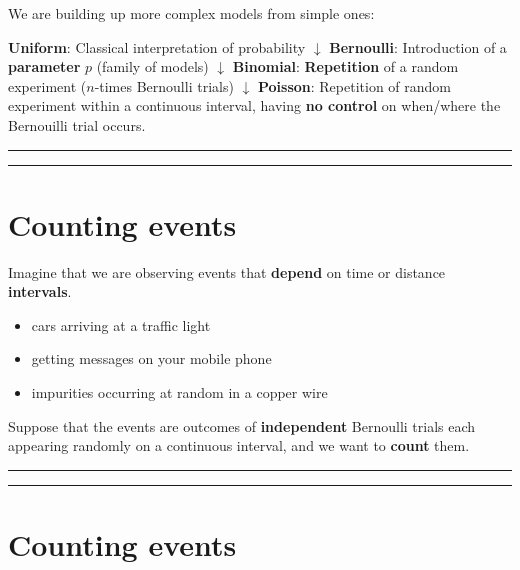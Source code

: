 \documentclass[
]{book}
\providecommand{\tightlist}{%
  \setlength{\itemsep}{0pt}\setlength{\parskip}{0pt}}
\begin{document}
We are building up more complex models from simple ones:

\textbf{Uniform}: Classical interpretation of probability
\(\downarrow\)
\textbf{Bernoulli}: Introduction of a \textbf{parameter} \(p\) (family of models)
\(\downarrow\)
\textbf{Binomial}: \textbf{Repetition} of a random experiment (\(n\)-times Bernoulli trials)
\(\downarrow\)
\textbf{Poisson}: Repetition of random experiment within a continuous interval, having \textbf{no control} on when/where the Bernouilli trial occurs.

\begin{center}\rule{0.5\linewidth}{0.5pt}\end{center}

\begin{center}\rule{0.5\linewidth}{0.5pt}\end{center}

\hypertarget{counting-events}{%
\section{Counting events}\label{counting-events}}

Imagine that we are observing events that \textbf{depend} on time or distance \textbf{intervals}.

\begin{itemize}
\tightlist
\item
  cars arriving at a traffic light
\item
  getting messages on your mobile phone
\item
  impurities occurring at random in a copper wire
\end{itemize}

Suppose that the events are outcomes of \textbf{independent} Bernoulli trials each appearing randomly on a continuous interval, and we want to \textbf{count} them.

\begin{center}\rule{0.5\linewidth}{0.5pt}\end{center}

\begin{center}\rule{0.5\linewidth}{0.5pt}\end{center}

\hypertarget{counting-events-1}{%
\section{Counting events}\label{counting-events-1}}
\end{document}
